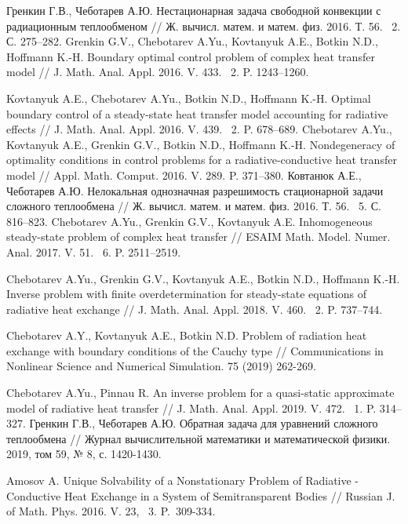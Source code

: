 \documentclass[12pt]{article}
\begin{document}
\begin{thebibliography}{999}
Гренкин Г.В., Чеботарев А.Ю. Нестационарная задача свободной конвекции с радиационным теплообменом // Ж. вычисл. матем. и матем. физ. 2016. Т. 56. \textnumero~2. С. 275--282.
Grenkin G.V., Chebotarev A.Yu., Kovtanyuk A.E., Botkin N.D., Hoffmann K.-H. Boundary optimal control problem of complex heat transfer model // J. Math. Anal. Appl. 2016. V. 433. \textnumero~2. P. 1243--1260.

Kovtanyuk A.E., Chebotarev A.Yu., Botkin N.D., Hoffmann K.-H. Optimal boundary control of a steady-state heat transfer model accounting for radiative effects // J. Math. Anal. Appl. 2016. V. 439. \textnumero~2. P. 678--689.
Chebotarev A.Yu., Kovtanyuk A.E., Grenkin G.V., Botkin N.D., Hoffmann K.-H.
Nondegeneracy of optimality conditions in control problems for a radiative-conductive heat transfer model // Appl. Math. Comput. 2016. V. 289. P. 371--380.
Ковтанюк А.Е., Чеботарев А.Ю. Нелокальная однозначная разрешимость стационарной задачи сложного теплообмена // Ж. вычисл. матем. и матем. физ. 2016. Т. 56. \textnumero~5. С. 816--823.
Chebotarev A.Yu., Grenkin G.V., Kovtanyuk A.E. Inhomogeneous steady-state problem of complex heat transfer // ESAIM Math. Model. Numer. Anal. 2017. V. 51. \textnumero~6. P. 2511--2519.

Chebotarev A.Yu., Grenkin G.V., Kovtanyuk A.E., Botkin N.D., Hoffmann K.-H. Inverse problem with finite overdetermination for steady-state equations of radiative heat exchange // J. Math. Anal. Appl. 2018. V. 460. \textnumero~2. P. 737--744.

Chebotarev A.Y., Kovtanyuk A.E., Botkin N.D. Problem of radiation heat exchange with boundary conditions of the Cauchy type // Communications in Nonlinear Science and Numerical Simulation. 75 (2019) 262-269.

Chebotarev A.Yu., Pinnau R. An inverse problem for a quasi-static approximate model of radiative heat transfer // J. Math. Anal. Appl. 2019. V. 472. \textnumero~1. P. 314--327.
 Гренкин Г.В., Чеботарев А.Ю. Обратная задача для уравнений сложного теплообмена // Журнал вычислительной математики и математической физики. 2019, том 59, № 8, с. 1420-1430.

Amosov A. Unique Solvability of a Nonstationary Problem of Radiative - Conductive
Heat Exchange in a System of Semitransparent Bodies // Russian J. of Math.
Phys. 2016. V. 23, \textnumero~3. P.~309-334.


\end{thebibliography}
\end{document}
